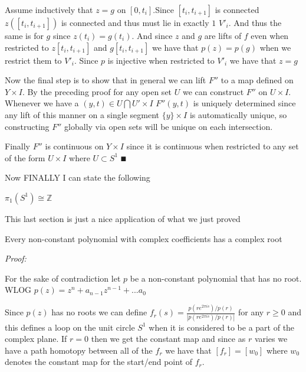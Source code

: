 \documentclass[paper=a4,fontsize=paper,12.5pt]{book}
\newcommand{\3}{\vspace*{3mm}}
\newcommand{\Proof}{\textit{Proof:}}
\newcommand{\Z}{\mathbb{Z}}
\newcommand{\C}[1]{{S}^{#1}}
\begin{document}
\3

Assume inductively that $z =g$ on $[0,{t}_{i}]$.Since $[{t}_{i},{t}_{i+1}]$ is connected $z([{t}_{i},{t}_{i+1}])$ is connected and thus must lie in exactly $1$ ${V'}_{i}$. And thus the same is for $g$ since $z({t}_{i}) = g({t}_{i})$. And since $z$ and $g$ are lifts of $f$ even when restricted to $z[{t}_{i},{t}_{i+1}] $ and $g[{t}_{i},{t}_{i+1}]$ we have that $p(z) = p(g)$ when we restrict them to ${V'}_{i}$. Since $p$ is injective when restricted to ${V'}_{i}$ we have that $z = g$ 

\3

Now the final step is to show that in general we can lift $F''$ to a map defined on $Y \times I$. By the preceding proof for any open set $U$ we can construct $F''$ on $U \times I$. Whenever we have a $(y,t) \in U \bigcap U' \times I$ $F''(y,t)$ is uniquely determined since any lift of this manner on a single segment $\{y\} \times I$ is automatically unique, so constructing $F''$ globally via open sets will be unique on each intersection.

\3

Finally $F''$ is continuous on $Y \times I$ since it is continuous when restricted to any set of the form $U \times I$ where $U \subset \C{1}$ $\QED$

\newpage

Now FINALLY I can state the following

\begin{corollary}

${\pi}_{1}(\C{1}) \cong \Z$

\end{corollary} 

\3

This last section is just a nice application of what we just proved

\3

\begin{theorem}

Every non-constant polynomial with complex coefficients has a complex root


\end{theorem}

\Proof

For the sake of contradiction let $p$ be a non-constant polynomial that has no root. WLOG $p(z) = {z}^{n} + {a}_{n-1}{z}^{n-1} + ... {a}_{0}$

\3

Since $p(z)$ has no roots we can define ${f}_{r}(s) = \frac{p(r{e}^{2\pi i s})/p(r)}{|p(r{e}^{2\pi i s})/p(r)|}$ for any $r \geq 0$ and this defines a loop on the unit circle $\C{1}$ when it is considered to be a part of the complex plane. If $r = 0$ then we get the constant map and since as $r$ varies we have a path homotopy between all of the ${f}_{r}$ we have that $[f_{r}] = [{w}_{0}]$ where ${w}_{0}$ denotes the constant map for the start/end point of ${f}_{r}$.
\end{document}
